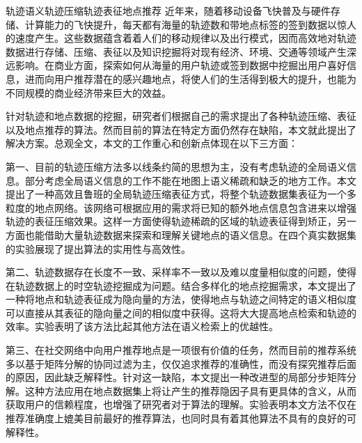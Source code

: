 
\begin{Cabstract}{轨迹语义}{轨迹压缩}{轨迹表征}{地点推荐}{}
近年来，随着移动设备飞快普及与硬件存储、计算能力的飞快提升，每天都有海量的轨迹数和带地点标签的签到数据以惊人的速度产生。这些数据蕴含着着人们的移动规律以及出行模式，因而高效地对轨迹数据进行存储、压缩、表征以及知识挖掘将对现有经济、环境、交通等领域产生深远影响。在商业方面，探索如何从海量的用户轨迹或签到数据中挖掘出用户喜好信息，进而向用户推荐潜在的感兴趣地点，将使人们的生活得到极大的提升，也能为不同规模的商业经济带来巨大的效益。

针对轨迹和地点数据的挖掘，研究者们根据自己的需求提出了各种轨迹压缩、表征以及地点推荐的算法。然而目前的算法在特定方面仍然存在缺陷，本文就此提出了解决方案。总观全文，本文的工作重心和创新点体现在以下三方面：

第一、目前的轨迹压缩方法多以线条约简的思想为主，没有考虑轨迹的全局语义信息。部分考虑全局语义信息的工作不能在地图上语义稀疏和缺乏的地方工作。本文提出了一种高效且鲁班的全局轨迹压缩表征方式，将整个轨迹数据集表征为一个多粒度的地点网络。该网络可根据应用的需求将已知的额外地点信息包含进来以增强轨迹的表征压缩效果。这样一方面使得轨迹稀疏的区域的轨迹表征得到矫正，另一方面也能借助大量轨迹数据来探索和理解关键地点的语义信息。在四个真实数据集的实验展现了提出算法的实用性与高效性。

第二、轨迹数据存在长度不一致、采样率不一致以及难以度量相似度的问题，使得在轨迹数据上的时空轨迹挖掘成为问题。结合多样化的地点挖掘需求，本文提出了一种将地点和轨迹表征成为隐向量的方法，使得地点与轨迹之间特定的语义相似度可以直接从其表征的隐向量之间的相似度中获得。这将大大提高地点检索和轨迹的效率。实验表明了该方法比起其他方法在语义检索上的优越性。

第三、在社交网络中向用户推荐地点是一项很有价值的任务，然而目前的推荐系统多以基于矩阵分解的协同过滤为主，仅仅追求推荐的准确性，而没有探究推荐后面的原因，因此缺乏解释性。针对这一缺陷，本文提出一种改进型的局部分步矩阵分解。这种方法应用在地点数据集上将让产生的推荐隐因子具有更具体的含义，从而获取用户的信赖程度，也增强了研究者对于算法的理解。实验表明本文方法不仅在推荐准确度上媲美目前最好的推荐算法，也同时具有着其他算法不具有的良好的可解释性。
\end{Cabstract}

